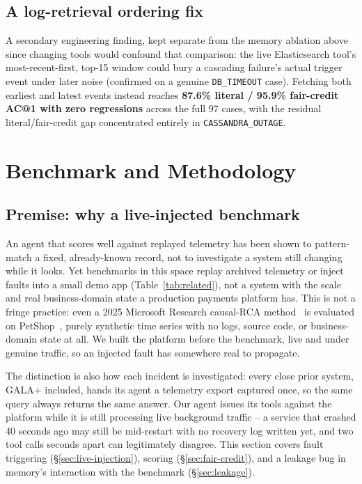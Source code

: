 \documentclass[conference]{IEEEtran}
\begin{document}
\subsection{A log-retrieval ordering fix}
\label{sec:esv2}

A secondary engineering finding, kept separate from the memory ablation above since changing tools would
confound that comparison: the live Elasticsearch tool's most-recent-first, top-15 window could bury a cascading
failure's actual trigger event under later noise (confirmed on a genuine \texttt{DB\_TIMEOUT} case). Fetching both
earliest and latest events instead reaches \textbf{87.6\% literal / 95.9\% fair-credit AC@1 with zero
regressions} across the full 97 cases, with the residual literal/fair-credit gap concentrated entirely in
\texttt{CASSANDRA\_OUTAGE}.

\section{Benchmark and Methodology}

\subsection{Premise: why a live-injected benchmark}
\label{sec:premise}

An agent that scores well against replayed telemetry has been shown to pattern-match a fixed, already-known
record, not to investigate a system still changing while it looks. Yet benchmarks in this space replay
archived telemetry or inject faults into a small demo app (Table~\ref{tab:related}), not a system with the
scale and real business-domain state a production payments platform has. This is not a fringe practice: even a
2025 Microsoft Research causal-RCA method~\cite{idi} is evaluated on PetShop~\cite{petshop}, purely synthetic
time series with no logs, source code, or business-domain state at all. We built the platform before the
benchmark, live and under genuine traffic, so an injected fault has somewhere real to propagate.

The distinction is also how each incident is investigated: every close prior system, GALA+ included, hands its
agent a telemetry export captured once, so the same query always returns the same answer. Our agent issues its
tools against the platform while it is still processing live background traffic -- a service that crashed 40
seconds ago may still be mid-restart with no recovery log written yet, and two tool calls seconds apart can
legitimately disagree. This section covers fault triggering (\S\ref{sec:live-injection}), scoring
(\S\ref{sec:fair-credit}), and a leakage bug in memory's interaction with the benchmark (\S\ref{sec:leakage}).
\end{document}
